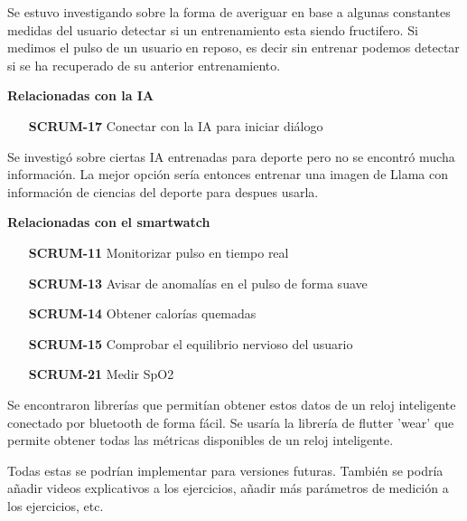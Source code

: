 \hspace{0.5cm}

Se estuvo investigando sobre la forma de averiguar en base a algunas constantes medidas del usuario detectar si un entrenamiento esta siendo fructifero. Si medimos el pulso de un usuario en reposo, es decir sin entrenar podemos detectar si se ha recuperado de su anterior entrenamiento.

\hspace{0.5cm}

\textbf{Relacionadas con la IA}
\begin{itemize}
		\item[\textbf{SCRUM-17}] Conectar con la IA para iniciar diálogo
\end{itemize}

\hspace{0.5cm}

Se investigó sobre ciertas IA entrenadas para deporte pero no se encontró mucha información. La mejor opción sería entonces entrenar una imagen de Llama con información de ciencias del deporte para despues usarla. 

\hspace{0.5cm}

\textbf{Relacionadas con el smartwatch}
\begin{itemize}
  	\item[\textbf{SCRUM-11}] Monitorizar pulso en tiempo real
	\item[\textbf{SCRUM-13}] Avisar de anomalías en el pulso de forma suave
	\item[\textbf{SCRUM-14}] Obtener calorías quemadas
	\item[\textbf{SCRUM-15}] Comprobar el equilibrio nervioso del usuario
	\item[\textbf{SCRUM-21}] Medir SpO2
\end{itemize}

\hspace{0.5cm}

Se encontraron librerías que permitían obtener estos datos de un reloj inteligente conectado por bluetooth de forma fácil. Se usaría la librería de flutter 'wear' que permite obtener todas las métricas disponibles de un reloj inteligente.

Todas estas se podrían implementar para versiones futuras. También se podría añadir videos explicativos a los ejercicios, añadir más parámetros de medición a los ejercicios, etc.